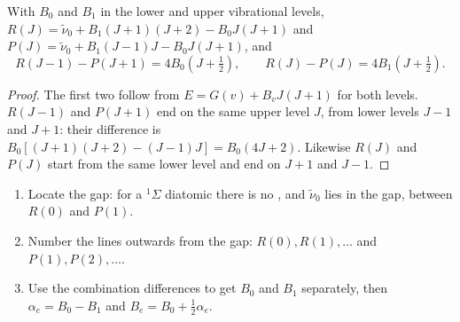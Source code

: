 \begin{theorem}\label{thm:b3:rovibrational-spectroscopy:combination-differences}
With  $B_0$ and $B_1$ in the lower and upper vibrational
levels, $R(J) = \tilde\nu_0 + B_1(J+1)(J+2) - B_0J(J+1)$ and $P(J) = \tilde\nu_0 +
B_1(J-1)J - B_0J(J+1)$, and
\[
R(J - 1) - P(J + 1) = 4B_0(J + \tfrac12), \qquad R(J) - P(J) = 4B_1(J + \tfrac12).
\]
\end{theorem}

\begin{proof}
The first two follow from $E = G(v) + B_vJ(J+1)$ for both levels. $R(J - 1)$ and
$P(J + 1)$ end on the same upper level $J$, from lower levels $J - 1$ and $J + 1$:
their difference is $B_0[(J+1)(J+2) - (J-1)J] = B_0(4J + 2)$. Likewise $R(J)$ and
$P(J)$ start from the same lower level and end on $J + 1$ and $J - 1$.
\end{proof}

\begin{method}\label{met:b3:rovibrational-spectroscopy:combination}
\begin{enumerate}
  \item Locate the gap: for a ${}^1\Sigma$ diatomic there is no , and
        $\tilde\nu_0$ lies in the gap, between $R(0)$ and $P(1)$.
  \item Number the lines outwards from the gap: $R(0), R(1), \dots$ and $P(1),
        P(2), \dots$.
  \item Use the combination differences to get $B_0$ and $B_1$
        separately, then $\alpha_e = B_0 - B_1$ and $B_e = B_0 + \frac12\alpha_e$.
\end{enumerate}
\end{method}

